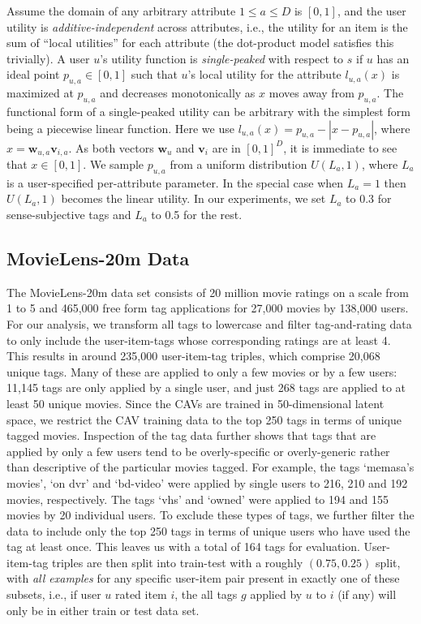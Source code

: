 \documentclass[manuscript,screen,nonacm]{acmart}
\newcommand{\1}{{\mathbf 1}}
\newcommand{\bfv}{\mathbf{v}}
\newcommand{\bfw}{\mathbf{w}}
\theoremstyle{TheoremNum}
\begin{document}
Assume the domain of any arbitrary attribute $1 \leq a \leq D$ is $[0,1]$, and the user utility is \emph{additive-independent} across attributes, i.e., the utility for an item is the sum of ``local utilities'' for each attribute (the dot-product model satisfies this trivially). %
A user $u$’s utility function is \emph{single-peaked} with respect to $s$ if $u$ has an ideal point $p_{u,a} \in [0,1]$ such that $u$’s local utility for the attribute $l_{u,a}(x)$ is maximized at $p_{u,a}$ and decreases monotonically as $x$ moves away from $p_{u,a}$. The functional form of a single-peaked utility can be arbitrary with the simplest form being a piecewise linear function. Here we use $l_{u,a}(x) = p_{u,a} - |x - p_{u,a}|$, where $x = \bfw_{u, a}\bfv_{i, a}$. As both vectors $\bfw_u$ and $\bfv_i$ are in $[0,1]^D$, it is immediate to see that $x \in [0, 1]$. We sample $p_{u,a}$ from a uniform distribution $U(L_a, 1)$, where $L_a$ is a user-specified per-attribute parameter. In the special case when $L_a=1$ then $U(L_a, 1)$ becomes the linear utility. In our experiments, we set $L_a$ to 0.3 for sense-subjective tags and $L_a$ to 0.5 for the rest. 

\subsection{MovieLens-20m Data}
\label{app:movielens}
The MovieLens-20m data set consists of 20 million movie ratings on a scale from 1 to 5 and 465,000 free form tag applications for 27,000 movies by 138,000 users.
For our analysis, we transform all tags to lowercase and filter tag-and-rating data to only include the user-item-tags whose corresponding ratings are at least 4.
This results in around 235,000 user-item-tag triples, which comprise 20,068 unique tags. Many of these are applied to only a few movies or by a few users: 11,145 tags are only applied by a single user, and just 268 tags are applied to at least 50 unique movies. Since the CAVs are trained in 50-dimensional latent space, we restrict the CAV training data to the top 250 tags in terms of unique tagged movies. Inspection of the tag data further shows that tags that are applied by only a few users tend to be overly-specific or overly-generic rather than descriptive of the particular movies tagged.
For example, the tags `memasa's movies', `on dvr' and `bd-video' were applied by single users to 216, 210 and 192 movies, respectively. The tags `vhs' and `owned' were applied to 194 and 155 movies by 20 individual users.
To exclude these types of tags, we further filter the data to include only the top 250 tags in terms of unique users who have used the tag at least once. This leaves us with a total of 164 tags for evaluation.
User-item-tag triples are then split into train-test with a roughly $(0.75,0.25)$ split, with \emph{all examples} for any specific user-item pair present in exactly one of these subsets, i.e., if user $u$ rated item $i$, the all tags $g$ applied by $u$ to $i$ (if any) will only be in either train or test data set.
\end{document}
